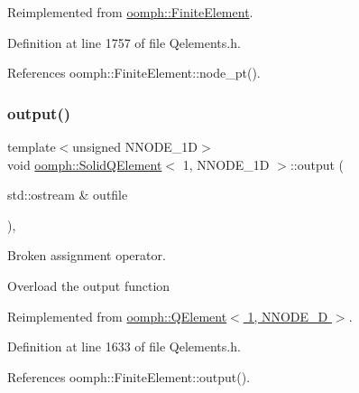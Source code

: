 Reimplemented from \hyperlink{classoomph_1_1FiniteElement_aaf7bead5b462cfd5401d97b3dbdc7af7}{oomph\+::\+Finite\+Element}.



Definition at line 1757 of file Qelements.\+h.



References oomph\+::\+Finite\+Element\+::node\+\_\+pt().

\mbox{\label{classoomph_1_1SolidQElement_3_011_00_01NNODE__1D_01_4_aa419f785459467534f9e365dc80383b7}} 
\subsubsection{\texorpdfstring{output()}{output()}\hspace{0.1cm}{\footnotesize\ttfamily [1/4]}}
{\footnotesize\ttfamily template$<$unsigned N\+N\+O\+D\+E\+\_\+1D$>$ \\
void \hyperlink{classoomph_1_1SolidQElement}{oomph\+::\+Solid\+Q\+Element}$<$ 1, N\+N\+O\+D\+E\+\_\+1D $>$\+::output (\begin{DoxyParamCaption}\item[{std\+::ostream \&}]{outfile }\end{DoxyParamCaption})\hspace{0.3cm}{\ttfamily [inline]}, {\ttfamily [virtual]}}



Broken assignment operator. 

Overload the output function 

Reimplemented from \hyperlink{classoomph_1_1QElement_3_011_00_01NNODE__1D_01_4_ac157449520794a71b85b66428c4e38ba}{oomph\+::\+Q\+Element$<$ 1, N\+N\+O\+D\+E\+\_\+D $>$}.



Definition at line 1633 of file Qelements.\+h.



References oomph\+::\+Finite\+Element\+::output().

\mbox{\label{classoomph_1_1SolidQElement_3_011_00_01NNODE__1D_01_4_af9949cdad7c4cd1a8a9c50385d00ce7f}} 
